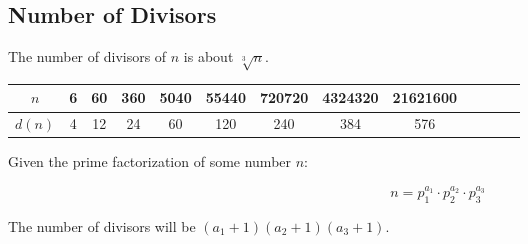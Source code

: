 \subsection{Number of Divisors}

The number of divisors of $n$ is about $\sqrt[3]{n}$.

\begin{table}[H]
    \centering
    \begin{tabular}{|c|c|c|c|c|c|c|c|c|c|c|c|c|}
        \hline
        \cellcolor{gray!40} $n$ & 6 & 60 & 360 & 5040 & 55440 & 720720 & 4324320 & 21621600 \\
        \hline
        \cellcolor{gray!40} $d(n)$ & 4 & 12 & 24 & 60 & 120 & 240 & 384 & 576 \\
        \hline
    \end{tabular}
\end{table}

Given the prime factorization of some number $n$:

$$n = p_{1}^{a_1} \cdot p_{2}^{a_2} \cdot p_{3}^{a_3}$$

The number of divisors will be $(a_1 + 1)(a_2 + 1)(a_3 + 1)$.